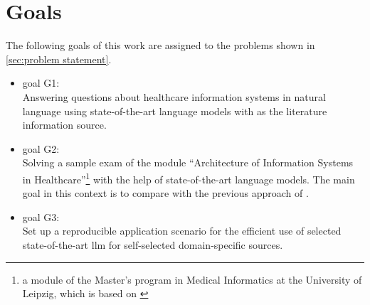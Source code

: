 \section{Goals}\label{sec:goals}
The following goals of this work are assigned to the problems shown in \cref{sec:problem statement}.
\begin{itemize}
  \item goal G1:\\
    Answering questions about healthcare information systems in natural language using state-of-the-art language models with \citet{bb2} as the literature information source. 
  \item goal G2:\\
   Solving a sample exam of the module \enquote{Architecture of Information Systems in Healthcare}\footnote{\raggedright{}a module of the Master's program in Medical Informatics at the University of Leipzig, which is based on \citet{bb2}} with the help of state-of-the-art language models.
   The main goal in this context is to compare with the previous approach of \citet{Paul_Keller} .
   \item goal G3:\\
   Set up a reproducible application scenario for the efficient use of selected state-of-the-art \ac{llm} for self-selected domain-specific sources.
\end{itemize}
